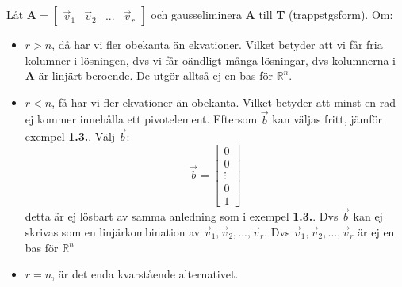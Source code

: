 \begin{bevis}
	Låt $\mathbf{A} = \begin{bmatrix} \vec{v}_1&\vec{v}_2&...&\vec{v}_r \end{bmatrix}$ och gausseliminera \textbf{A} till \textbf{T} (trappstgsform). Om:
	\begin{itemize}
		\item $r > n$, då har vi fler obekanta än ekvationer. Vilket betyder att vi får fria kolumner i lösningen, dvs vi får oändligt många lösningar, dvs kolumnerna i \textbf{A} är linjärt beroende. De utgör alltså ej en bas för $\mathbb{R}^n$.
		\item $r < n$, få har vi fler ekvationer än obekanta. Vilket betyder att minst en rad ej kommer innehålla ett pivotelement. Eftersom $\vec{b}$ kan väljas fritt, jämför exempel \textbf{1.3.}. Välj $\vec{b}$:
		\[
		\vec{b} = \begin{bmatrix} 0\\0\\\vdots\\0\\1 \end{bmatrix}
		\]
		detta är ej lösbart av samma anledning som i exempel \textbf{1.3.}. Dvs $\vec{b}$ kan ej skrivas som en linjärkombination av $\vec{v}_1, \vec{v}_2,..., \vec{v}_r$. Dvs $\vec{v}_1, \vec{v}_2,..., \vec{v}_r$ är ej en bas för $\mathbb{R}^n$
		\item $r = n$, är det enda kvarstående alternativet.
	\end{itemize}
\end{bevis}
